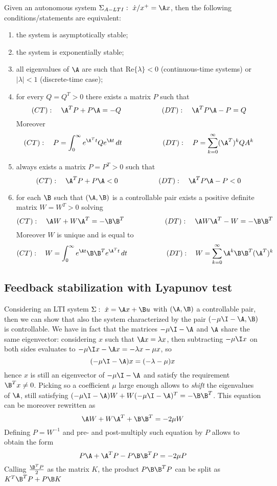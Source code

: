 	\noindent
	Given an autonomous system $\Sigma_{A-LTI}: \ \dot x /x^+ = \A x$, then the following conditions/statements are equivalent:
	\begin{enumerate}
		\item the system is asymptotically stable;
		\item the system is exponentially stable;
		\item all eigenvalues of $\A$ are such that $\textrm{Re}\{\lambda\} < 0 $ (continuous-time systems) or $|\lambda| < 1$ (discrete-time case);
		\item for every $Q = Q^T > 0$ there exists a matrix $P$ such that
		\[ (CT): \quad \A^T P + P \A = - Q \hspace{2cm} (DT): \quad \A^T P \A - P = Q \]
		Moreover
		\[ (CT): \quad P = \int_0^\infty e^{\A^T t} Q e^{\A t}\, dt \hspace{2cm} (DT): \quad P = \sum_{k = 0}^\infty (\A^T)^k Q A^k \]
		\item always exists a matrix $P = P^T > 0$ such that
		\[ (CT): \quad \A^T P + P \A < 0 \hspace{2cm} (DT): \quad \A^T P \A - P < 0 \]
		\item for each $\B$ such that $(\A,\B)$ is a controllable pair exists a positive definite matrix $W = W^T > 0$ solving
		\[ (CT): \quad \A W + W \A^T = - \B\B^T \hspace{2cm} (DT): \quad \A W \A^T - W = - \B \B^T \]
		Moreover $W$ is unique and is equal to
		\[ (CT): \quad W = \int_0^\infty e^{\A t} \B \B^T e^{\A^T t}\, dt \hspace{2cm} (DT): \quad W = \sum_{k=0}^{\infty} \A^k \B \B^T (\A^T)^k \]
	\end{enumerate}

\subsection{Feedback stabilization with Lyapunov test}
	Considering an LTI system $\Sigma: \ \dot x = \A x + \B u$ with $(\A,\B)$ a controllable pair, then we can show that also the system characterized by the pair $(-\mu \I- \A,\B)$ is controllable. We have in fact that the matrices $-\mu \I - \A$ and $\A$ share the same eigenvector: considering $x$ such that $\A x = \lambda x$, then subtracting $-\mu \I x$ on both sides evaluates to $-\mu \I x - \A x = - \lambda x - \mu x$, so
	\[ (-\mu \I- \A) x = (-\lambda - \mu) x \]
	hence $x$ is still an eigenvector of $-\mu \I - \A$ and satisfy the requirement $\B^T x \neq 0$. Picking so a coefficient $\mu$ large enough allows to \textit{shift} the eigenvalues of $\A$, still satisfying $(-\mu \I - \A)W + W(-\mu \I - \A)^T = - \B \B^T$. This equation can be moreover rewritten as
	\[ \A W + W \A^T + \B \B^T = -2\mu W  \]
	Defining $P = W^{-1}$ and pre- and post-multiply such equation by $P$ allows to obtain the form
	\[ P\A + \A^T P- P\B\B^T P = -2\mu P \]
	Calling $\frac{\B^TP}{2}$ as the matrix $K$, the product $P\B\B^TP$ can be split as $K^T\B^TP +P\B K$
	
	
	
	
	
	
	